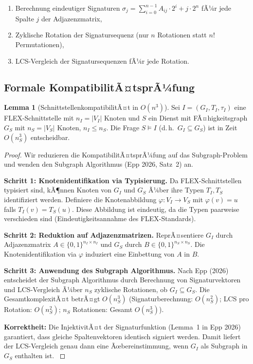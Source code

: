 ﻿\documentclass[a4paper,12pt]{article}
\theoremstyle{definition}
\newtheorem{lemma}{Lemma}
\begin{document}
\begin{enumerate}
    \item Berechnung eindeutiger Signaturen $\sigma_j = \sum_{i=0}^{n-1} A_{ij} \cdot 2^i + j \cdot 2^n$ fÃ¼r jede Spalte $j$ der Adjazenzmatrix,
    \item Zyklische Rotation der Signatursequenz (nur $n$ Rotationen statt $n!$ Permutationen),
    \item LCS-Vergleich der Signatursequenzen fÃ¼r jede Rotation.
\end{enumerate}

\subsection{Formale KompatibilitÃ¤tsprÃ¼fung}

\begin{lemma}[SchnittstellenkompatibilitÃ¤t in $O(n^3)$]
\label{lem:kompatibilitaet}
Sei $I = (G_I, T_I, \tau_I)$ eine FLEX-Schnittstelle mit $n_I = |V_I|$ Knoten und $S$ ein Dienst mit FÃ¤higkeitsgraph $G_S$ mit $n_S = |V_S|$ Knoten, $n_I \leq n_S$. Die Frage $S \models I$ (d.\,h.\ $G_I \subseteq G_S$) ist in Zeit $O(n_S^3)$ entscheidbar.
\end{lemma}

\begin{proof}
Wir reduzieren die KompatibilitÃ¤tsprÃ¼fung auf das Subgraph-Problem und wenden den Subgraph Algorithmus (Epp 2026, Satz~2) an.

\textbf{Schritt 1: Knotenidentifikation via Typisierung.} Da FLEX-Schnittstellen typisiert sind, kÃ¶nnen Knoten von $G_I$ und $G_S$ Ã¼ber ihre Typen $T_I, T_S$ identifiziert werden. Definiere die Knotenabbildung $\varphi: V_I \to V_S$ mit $\varphi(v) = u$ falls $T_I(v) = T_S(u)$. Diese Abbildung ist eindeutig, da die Typen paarweise verschieden sind (Eindeutigkeitsannahme des FLEX-Standards).

\textbf{Schritt 2: Reduktion auf Adjazenzmatrizen.} ReprÃ¤sentiere $G_I$ durch Adjazenzmatrix $A \in \{0,1\}^{n_I \times n_I}$ und $G_S$ durch $B \in \{0,1\}^{n_S \times n_S}$. Die Knotenidentifikation via $\varphi$ induziert eine Einbettung von $A$ in $B$.

\textbf{Schritt 3: Anwendung des Subgraph Algorithmus.} Nach Epp (2026) entscheidet der Subgraph Algorithmus durch Berechnung von Signaturvektoren und LCS-Vergleich Ã¼ber $n_S$ zyklische Rotationen, ob $G_I \subseteq G_S$. Die GesamtkomplexitÃ¤t betrÃ¤gt $O(n_S^3)$ (Signaturberechnung: $O(n_S^2)$; LCS pro Rotation: $O(n_S^2)$; $n_S$ Rotationen: Gesamt $O(n_S^3)$).

\textbf{Korrektheit:} Die InjektivitÃ¤t der Signaturfunktion (Lemma~1 in Epp 2026) garantiert, dass gleiche Spaltenvektoren identisch signiert werden. Damit liefert der LCS-Vergleich genau dann eine Ãœbereinstimmung, wenn $G_I$ als Subgraph in $G_S$ enthalten ist. $
$
\end{proof}
\end{document}
